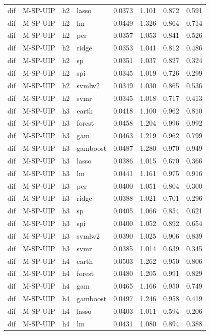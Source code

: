 \begin{ThreePartTable}
\begin{longtable}[t]{llclcccc}
dif & M-SP-UIP & h2 & lasso & 0.0373 & 1.101 & 0.872 & 0.591\\
dif & M-SP-UIP & h2 & lm & 0.0449 & 1.326 & 0.864 & 0.714\\
dif & M-SP-UIP & h2 & pcr & 0.0357 & 1.053 & 0.841 & 0.526\\
dif & M-SP-UIP & h2 & ridge & 0.0353 & 1.041 & 0.812 & 0.486\\
dif & M-SP-UIP & h2 & sp & 0.0351 & 1.037 & 0.827 & 0.324\\
dif & M-SP-UIP & h2 & spi & 0.0345 & 1.019 & 0.726 & 0.299\\
dif & M-SP-UIP & h2 & svmlw2 & 0.0349 & 1.030 & 0.865 & 0.536\\
dif & M-SP-UIP & h2 & svmr & 0.0345 & 1.018 & 0.717 & 0.413\\
\addlinespace
dif & M-SP-UIP & h3 & earth & 0.0418 & 1.100 & 0.962 & 0.810\\
dif & M-SP-UIP & h3 & forest & 0.0458 & 1.204 & 0.996 & 0.992\\
dif & M-SP-UIP & h3 & gam & 0.0463 & 1.219 & 0.962 & 0.799\\
dif & M-SP-UIP & h3 & gamboost & 0.0487 & 1.280 & 0.970 & 0.949\\
dif & M-SP-UIP & h3 & lasso & 0.0386 & 1.015 & 0.670 & 0.366\\
dif & M-SP-UIP & h3 & lm & 0.0441 & 1.161 & 0.975 & 0.916\\
dif & M-SP-UIP & h3 & pcr & 0.0400 & 1.051 & 0.804 & 0.300\\
dif & M-SP-UIP & h3 & ridge & 0.0388 & 1.021 & 0.701 & 0.296\\
dif & M-SP-UIP & h3 & sp & 0.0405 & 1.066 & 0.854 & 0.621\\
dif & M-SP-UIP & h3 & spi & 0.0400 & 1.052 & 0.892 & 0.654\\
dif & M-SP-UIP & h3 & svmlw2 & 0.0390 & 1.025 & 0.906 & 0.839\\
dif & M-SP-UIP & h3 & svmr & 0.0385 & 1.014 & 0.639 & 0.345\\
\addlinespace
dif & M-SP-UIP & h4 & earth & 0.0503 & 1.262 & 0.950 & 0.806\\
dif & M-SP-UIP & h4 & forest & 0.0480 & 1.205 & 0.991 & 0.829\\
dif & M-SP-UIP & h4 & gam & 0.0465 & 1.166 & 0.950 & 0.749\\
dif & M-SP-UIP & h4 & gamboost & 0.0497 & 1.246 & 0.958 & 0.419\\
dif & M-SP-UIP & h4 & lasso & 0.0403 & 1.011 & 0.594 & 0.206\\
dif & M-SP-UIP & h4 & lm & 0.0431 & 1.080 & 0.894 & 0.388\\

\end{longtable}
\end{ThreePartTable}
